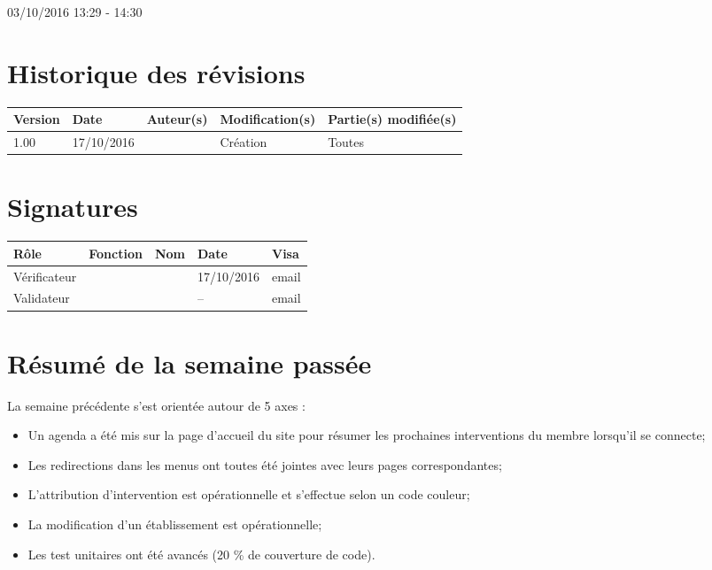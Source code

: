 \documentclass [a4paper] {article}
\begin{document}
03/10/2016			 				%
\hfill   
\hfill 	 13:29 - 14:30				%


\section*{Historique des révisions}
\begin{center}
			\begin{tabular}{| p{2.5cm} | p{3cm} | p{3cm} | p{3cm} | p{3.5cm} |}
				\hline
				\rowcolor{Gray}
				Version & Date & Auteur(s) & Modification(s) & Partie(s) modifiée(s)		 \\
				\hline
				1.00 & 17/10/2016 & \Kafui & Création & Toutes \\
				\hline			
			\end{tabular}
		\end{center}

\section*{Signatures}

		\begin{center}
			\begin{tabular}{| p{2.5cm} | p{4cm} | p{3cm} | p{3cm} | p{2.5cm} |}
				\hline
				\rowcolor{Gray}
				Rôle & Fonction & Nom & Date & Visa		 \\
				\hline
				Vérificateur & \RGC & \Melissa & 17/10/2016 & email \\[30pt]
				\hline
				Validateur & \CP & \Pierre &  -- & email \\[30pt]	
				\hline
			\end{tabular}
		\end{center}

\section{Résumé de la semaine passée}
La semaine précédente s'est orientée autour de 5 axes :  
\begin{itemize}
	\item Un agenda a été mis sur la page d'accueil du site pour résumer les prochaines interventions du membre lorsqu'il se connecte;
	\item Les redirections dans les menus ont toutes été jointes avec leurs pages correspondantes;
	\item L'attribution d'intervention est opérationnelle et s'effectue selon un code couleur;
	\item La modification d'un établissement est opérationnelle;
	\item Les test unitaires ont été avancés (20 \% de couverture de code).
\end{itemize} 
\end{document}
